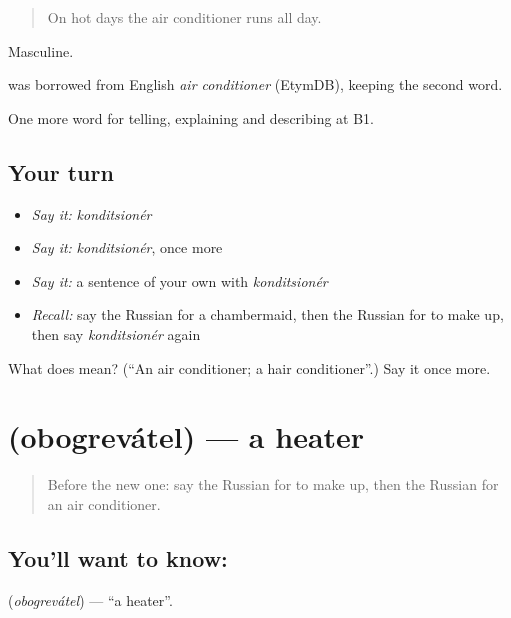 \begin{quote}
On hot days the air conditioner runs all day.
\end{quote}

Masculine.

\begin{cousinweb}
\emph{} was borrowed from English \emph{air conditioner} (EtymDB), keeping the second word.
\end{cousinweb}

\begin{grammarlens}[title={What you've built}]
One more word for telling, explaining and describing at B1.
\end{grammarlens}

\subsection*{Your turn}
\begin{itemize}
\raggedright
  \item \emph{Say it:} \emph{konditsionér}
  \item \emph{Say it:} \emph{konditsionér}, once more
  \item \emph{Say it:} a sentence of your own with \emph{konditsionér}
  \item \emph{Recall:} say the Russian for a chambermaid, then the Russian for to make up, then say \emph{konditsionér} again
\end{itemize}

\begin{tcolorbox}[breakable,colback=teal!4,colframe=teal!35!black,title={Before you move on}]
What does  mean? (\textquotedblleft{}An air conditioner; a hair conditioner\textquotedblright{}.) Say it once more.
\end{tcolorbox}
\section[\texorpdfstring{\ru{обогреватель} (obogrevátel)}{обогреватель (obogrevátel)}]{ (obogrevátel) — a heater}

\label{lesson:RU-C431-obogrevatel}



\begin{quote}
Before the new one: say the Russian for to make up, then the Russian for an air conditioner.
\end{quote}

\subsection*{You'll want to know: }
\textbf{} (\emph{obogrevátel}) — \textquotedblleft{}a heater\textquotedblright{}.

